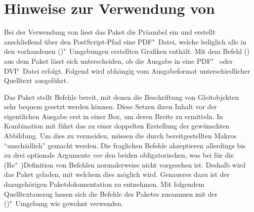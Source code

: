 \section{%
  Hinweise zur Verwendung von %
  \label{sec:tips:auto-pst-pdf}%
}

%
Bei der Verwendung von  liest das Paket  
die Präambel ein und erstellt anschließend über den PostScript-Pfad 
 eine PDF"~Datei, welche lediglich alle in den 
vorhandenen ()"~Umgebungen erstellten 
Grafiken enthält. Mit dem Befehl () aus dem Paket 
 lässt sich unterscheiden, ob die Ausgabe in eine PDF"~ oder 
DVI"~Datei erfolgt. Folgend wird abhängig vom Ausgabeformat unterschiedlicher 
Quelltext ausgeführt.
%
\begin{quoting}
\begin{Code}
\usepackage{iftex}
\end{Code}
\end{quoting}



Das Paket  stellt Befehle bereit, mit denen die Beschriftung 
von Gleitobjekten sehr bequem gesetzt werden können. Diese Setzen ihren Inhalt 
vor der eigentlichen Ausgabe erst in einer Box, um deren Breite zu ermitteln. 
In Kombination mit  führt das zu einer doppelten 
Erstellung der gewünschten Abbildung. Um dies zu vermeiden, müssen die durch 
 bereitgestellten Makros \enquote{unschädlich} gemacht 
werden. Die fraglichen Befehle akzeptieren allerdings bis zu drei optionale 
Argumente \emph{vor} den beiden obligatorischen, was bei  für die 
(Re"~)Definition von Befehlen normalerweise nicht vorgesehen ist. Deshalb wird 
das Paket  geladen, mit welchem dies möglich wird. Genaueres 
dazu ist der dazugehörigen Paketdokumentation zu entnehmen. Mit folgendem 
Quelltextauszug lassen sich die Befehle des Paketes  zusammen 
mit der ()"~Umgebung wie gewohnt 
verwenden.
%
\begin{quoting}
\begin{Code}
\usepackage{floatrow}
\usepackage{xparse}
\ifpdf\else
\fi
\end{Code}
\end{quoting}


